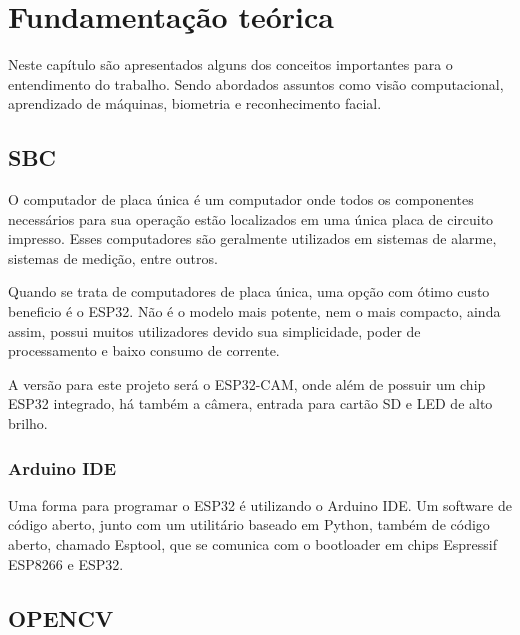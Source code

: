 \chapter{Fundamentação te\'orica}\label{cap:referencialTeorico}

Neste capítulo são apresentados alguns dos conceitos importantes para o entendimento
do trabalho. Sendo abordados assuntos como visão computacional, aprendizado de máquinas,
biometria e reconhecimento facial.

\section{SBC}\label{sec:formatacaoTexto}

O computador de placa única é um computador onde todos os componentes
necessários para sua operação estão localizados em uma única placa de circuito impresso. Esses
computadores são geralmente utilizados em sistemas de alarme, sistemas de medição, entre
outros.

Quando se trata de computadores de placa única, uma opção com ótimo custo beneficio 
é o ESP32. Não é o modelo mais potente, nem o mais compacto, ainda assim, possui muitos 
utilizadores devido sua simplicidade, poder de processamento e baixo consumo de corrente.

A versão para este projeto será o ESP32-CAM, onde além de possuir um chip ESP32 
integrado, há também a câmera, entrada para cartão SD e LED de alto brilho.

\subsection{Arduino IDE}\label{sec:espacamento}

Uma forma para programar o ESP32 é utilizando o Arduino IDE.
Um software de código aberto, junto com um utilitário baseado em Python, também de código
aberto, chamado Esptool, que se comunica com o bootloader em chips Espressif ESP8266 e
ESP32.

\section{OPENCV}\label{sec:formatacaoTexto}

